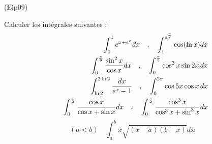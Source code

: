 \begin{tiny}(Eip09)\end{tiny}
Calculer les int{\'e}grales suivantes :
\begin{eqnarray*}
&&\int_{0}^{1}e^{x+e^{x}}dx\quad ,\quad \int_{1}^{e^{\frac{\pi
}{2}}}\cos
(\ln x)dx \\
&&\int_{0}^{\frac{\pi }{6}}\frac{\sin ^{2}x}{\cos x}dx\quad ,\quad \int_{0}^{%
\frac{\pi }{3}}\cos ^{3}x\sin 2x\,dx \\
&&\int_{\ln 2}^{2\ln 2}\frac{dx}{e^{x}-1}\quad ,\quad
\int_{0}^{2\pi }\cos
5x\cos x\,dx \\
&&\int_{0}^{\frac{\pi }{2}}\frac{\cos x}{\cos x+\sin x}dx\quad
,\quad \int_{0}^{\frac{\pi }{2}}\frac{\cos ^{3}x}{\cos ^{3}x+\sin
^{3}x}dx
\end{eqnarray*}
\[
(a<b)\quad \int_{a}^{b}x\sqrt{(x-a)(b-x)}dx
\]
